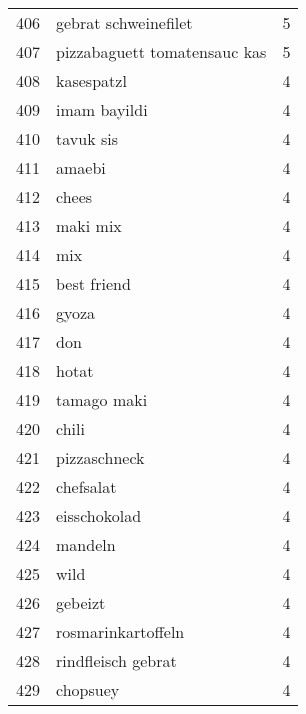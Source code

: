 \begin{tabular}{llr}
406  &                               gebrat schweinefilet &      5 \\
407  &                       pizzabaguett tomatensauc kas &      5 \\
408  &                                         kasespatzl &      4 \\
409  &                                       imam bayildi &      4 \\
410  &                                          tavuk sis &      4 \\
411  &                                             amaebi &      4 \\
412  &                                              chees &      4 \\
413  &                                           maki mix &      4 \\
414  &                                                mix &      4 \\
415  &                                        best friend &      4 \\
416  &                                              gyoza &      4 \\
417  &                                                don &      4 \\
418  &                                              hotat &      4 \\
419  &                                        tamago maki &      4 \\
420  &                                              chili &      4 \\
421  &                                       pizzaschneck &      4 \\
422  &                                          chefsalat &      4 \\
423  &                                       eisschokolad &      4 \\
424  &                                            mandeln &      4 \\
425  &                                               wild &      4 \\
426  &                                            gebeizt &      4 \\
427  &                                 rosmarinkartoffeln &      4 \\
428  &                                 rindfleisch gebrat &      4 \\
429  &                                           chopsuey &      4 \\

\end{tabular}

